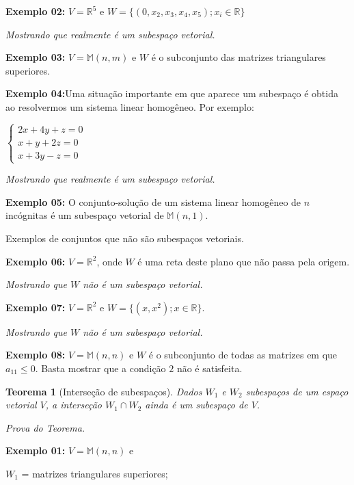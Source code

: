 \documentclass[oneside,a4paper,12pt]{article}
\newtheorem{theorem}{Teorema}[section]
\begin{document}
{\bf Exemplo 02:} $V = \mathbb{R}^5$ e $W = \{(0,x_2, x_3, x_4, x_5); x_i \in \mathbb{R} \}$

\emph{Mostrando que realmente é um subespaço vetorial.}

\vspace{50pt}

{\bf Exemplo 03:} $V = \mathbb{M}(n,m)$ e $W$ é o subconjunto das matrizes triangulares superiores.

{\bf Exemplo 04:}Uma situação importante em que aparece um subespaço é obtida ao resolvermos um sistema linear homogêneo. Por exemplo:

$
\begin{cases}
2x + 4y + z = 0 \\
x + y + 2z = 0 \\
x + 3y - z = 0
\end{cases}
$

\emph{Mostrando que realmente é um subespaço vetorial.}
\vspace{50pt}

{\bf Exemplo 05:} O conjunto-solução de um sistema linear homogêneo de $n$ incógnitas é um subespaço vetorial de $\mathbb{M}(n,1)$.

Exemplos de conjuntos que não são subespaços vetoriais.

{\bf Exemplo 06:} $V = \mathbb{R}^2$, onde $W$ é uma reta deste plano que não passa pela origem.

\emph{Mostrando que $W$ não é um subespaço vetorial.}
\vspace{50pt}

{\bf Exemplo 07:} $V = \mathbb{R}^2$ e $W = \{(x,x^2); x \in \mathbb{R}\}$.

\emph{Mostrando que $W$ não é um subespaço vetorial.}
\vspace{50pt}

{\bf Exemplo 08:} $V = \mathbb{M}(n,n)$ e $W$ é o subconjunto de todas as matrizes em que $a_{11} \leq 0$. Basta mostrar que a condição $2$ não é satisfeita.

\begin{theorem}[Interseção de subespaços]
	Dados $W_1$ e $W_2$ subespaços de um espaço vetorial $V$, a interseção $W_1 \cap W_2$ ainda é um subespaço de $V$.
\end{theorem}

\emph{Prova do Teorema.}
\vspace{50pt}

{\bf Exemplo 01:} $V = \mathbb{M}(n,n)$ e 

$W_1$ = {matrizes triangulares superiores};
\end{document}
